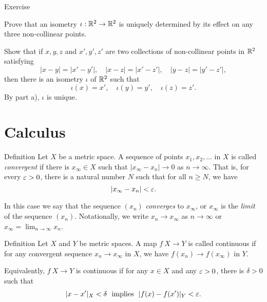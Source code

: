\begin{thm}{Exercise}\label{ex:IsometriesOfR2}

\begin{subthm}{} \label{ex:IsometriesOfR2Uniqueness}
Prove that an isometry $\iota: \mathbb{R}^2 \to \mathbb{R}^2$ is uniquely determined by its effect on any three non-collinear points.
\end{subthm}

\begin{subthm}{}\label{ex:IsometriesOfR2Existence}
Show that if $x, y, z$ and  $x', y', z'$ are two collections of non-collinear points in $\mathbb{R}^2$ satisfying
$$|x - y| = |x' - y'|, \quad |x - z| = |x' - z'|, \quad |y - z| = |y' - z'|,$$
then there is an isometry $\iota$ of $\mathbb{R}^2$ such that
\[ \iota(x) = x', \quad \iota(y) = y', \quad \iota(z) = z'. \]  By part a), $\iota$ is unique.
\end{subthm}
\end{thm}

\section*{Calculus}

\begin{thm}{Definition}
 Let $X$ be a metric space.
A sequence of points $x_1, x_2, \ldots$ in $X$ is called \emph{convergent}
if there is 
$x_\infty\in X$ such that $|x_\infty -x_n|\to 0$ as $n\to\infty$.  
That is, for every $\varepsilon > 0$, there is a natural number $N$ such that for all $n \ge N$, we have $$|x_\infty-x_n| < \varepsilon.$$

In this case we say that the sequence $(x_n)$ \emph{converges} to $x_\infty$, 
or $x_\infty$ is the \emph{limit} of the sequence $(x_n)$.
Notationally, we write $x_n\to x_\infty$ as $n\to\infty$
or $x_\infty=\lim_{n\to\infty} x_n$.
\end{thm}

\begin{thm}{Definition}
Let $X$ and $Y$ be metric spaces.
A map $f\:X\to Y$ is called continuous if for any convergent sequence $x_n\to x_\infty$ in $X$,
we have $f(x_n) \to f(x_\infty)$ in $Y$.

Equivalently, $f\:X\to Y$ is continuous if for any $x\in X$ and any $\varepsilon>0$,
there is $\delta>0$ such that 
$$|x-x'|_X<\delta\ \text{ implies }\ |f(x)-f(x')|_Y<\varepsilon.$$

\end{thm}

